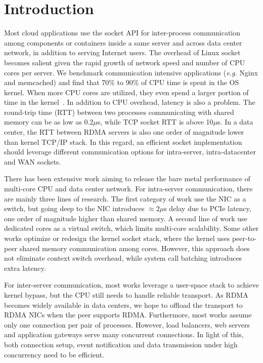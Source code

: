 \section{Introduction}
\label{sec:intro}

Most cloud applications use the socket API for inter-process communication among components or containers inside a same server and across data center network, in addition to serving Internet users. The overhead of Linux socket becomes salient given the rapid growth of network speed and number of CPU cores per server. We benchmark communication intensive applications (\textit{e.g.} Nginx and memcached) and find that 70\% to 90\% of CPU time is spent in the OS kernel. When more CPU cores are utilized, they even spend a larger portion of time in the kernel~\cite{boyd2010analysis}. In addition to CPU overhead, latency is also a problem. The round-trip time (RTT) between two processes communicating with shared memory can be as low as 0.2$\mu$s, while TCP socket RTT is above 10$\mu$s. In a data center, the RTT between RDMA servers is also one order of magnitude lower than kernel TCP/IP stack. In this regard, an efficient socket implementation should leverage different communication options for intra-server, intra-datacenter and WAN sockets.

There has been extensive work aiming to release the bare metal performance of multi-core CPU and data center network. For intra-server communication, there are mainly three lines of research. The first category of work use the NIC as a switch, but going deep to the NIC introduces $\approx2 \mu$s delay due to PCIe latency, one order of magnitude higher than shared memory. A second line of work use dedicated cores as a virtual switch, which limits multi-core scalability. Some other works optimize or redesign the kernel socket stack, where the kernel uses peer-to-peer shared memory communication among cores. However, this approach does not eliminate context switch overhead, while system call batching introduces extra latency.

For inter-server communication, most works leverage a user-space stack to achieve kernel bypass, but the CPU still needs to handle reliable transport. As RDMA becomes widely available in data centers, we hope to offload the transport to RDMA NICs when the peer supports RDMA. Furthermore, most works assume only one connection per pair of processes. However, load balancers, web servers and application gateways serve many concurrent connections. In light of this, both connection setup, event notification and data transmission under high concurrency need to be efficient.

